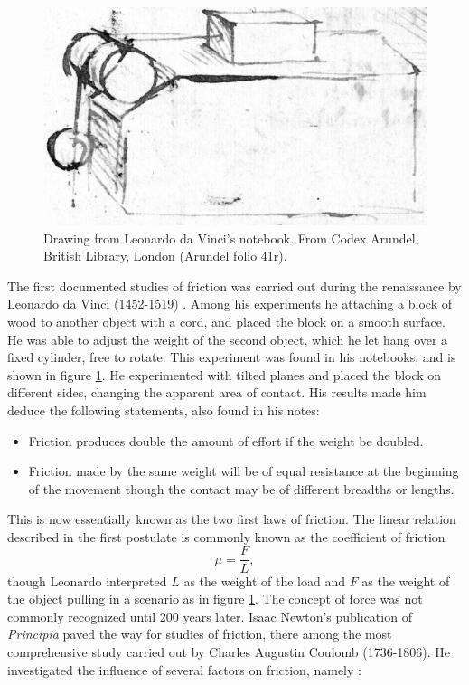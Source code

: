 \documentclass[twoside,english]{uiofysmaster}
\begin{document}
\begin{figure}[H]
	\centering
	\includegraphics[width=0.5\linewidth]{figures/friction/LeonardoDaVinciBW}
	\caption{Drawing from Leonardo da Vinci's notebook. From Codex Arundel, British Library, London (Arundel folio 41r).}
	\label{fig:leonardoDaVinci}
\end{figure}
\noindent 
The first documented studies of friction was carried out during the renaissance by Leonardo da Vinci (1452-1519) \cite{LeonardoDaVinciStudies}.
Among his experiments he attaching a block of wood to another object with a cord, and placed the block on a smooth surface.
He was able to adjust the weight of the second object, which he let hang over a fixed cylinder, free to rotate. 
This experiment was found in his notebooks, and is shown in figure \ref{fig:leonardoDaVinci}.
He experimented with tilted planes and placed the block on different sides, changing the apparent area of contact.
His results made him deduce the following statements, also found in his notes:
\begin{itemize}
	\item Friction produces double the amount of effort if the weight be doubled. 
	\item Friction made by the same weight will be of equal resistance at the beginning of the movement though the contact may be of different breadths or lengths.
\end{itemize}
This is now essentially known as the two first laws of friction. 
The linear relation described in the first postulate is commonly known as the coefficient of friction
\begin{equation}
	\mu = \frac{F}{L}, \label{eq:coefficientOfFriction}
\end{equation}
though Leonardo interpreted $L$ as the weight of the load and $F$ as the weight of the object pulling in a scenario as in figure \ref{fig:leonardoDaVinci}. The concept of force was not commonly recognized until 200 years later. Isaac Newton's publication of \textit{Principia} paved the way for studies of friction, there among the most comprehensive study carried out by Charles Augustin Coulomb (1736-1806). He investigated the influence of several factors on friction, namely \cite{SlidingFriction}:
\end{document}

